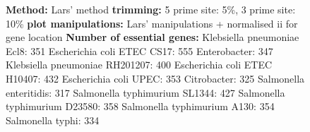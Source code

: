 \documentclass[a4paper,10pt]{article}
\begin{document}
\begin{figure}
{\textbf{Method:} Lars' method \newline
\textbf{trimming:} 5 prime site: 5\%, 3 prime site: 10\%\newline
\textbf{plot manipulations:} Lars' manipulations + normalised ii for gene location\newline
\textbf{Number of essential genes:}\newline
Klebsiella pneumoniae Ecl8: 351 \newline
Escherichia coli ETEC CS17: 555 \newline
Enterobacter: 347 \newline
Klebsiella pneumoniae RH201207: 400 \newline
Escherichia coli ETEC H10407: 432 \newline
Escherichia coli UPEC: 353 \newline
Citrobacter: 325 \newline
Salmonella enteritidis: 317 \newline
Salmonella typhimurium SL1344: 427 \newline
Salmonella typhimurium D23580: 358 \newline
Salmonella typhimurium A130: 354 \newline
Salmonella typhi: 334}
\end{figure}
\end{document}
